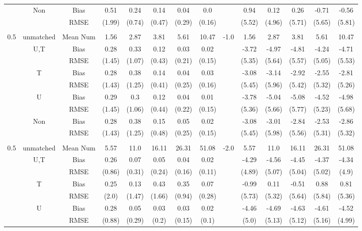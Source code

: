 \begin{tabular}{@{\extracolsep{5pt}}lc|cccccc|lccccc}
 & Non & Bias & 0.51 & 0.24 & 0.14 & 0.04 & 0.0 &  & 0.94 & 0.12 & 0.26 & -0.71 & -0.56 \\
 &  & RMSE & (1.99) & (0.74) & (0.47) & (0.29) & (0.16) &  & (5.52) & (4.96) & (5.71) & (5.65) & (5.81) \\
 &  &  &  &  &  &  &  &  &  &  &  &  &  \\
0.5 & unmatched & Mean Num & 1.56 & 2.87 & 3.81 & 5.61 & 10.47 & -1.0 & 1.56 & 2.87 & 3.81 & 5.61 & 10.47 \\
 & U,T & Bias & 0.28 & 0.33 & 0.12 & 0.03 & 0.02 &  & -3.72 & -4.97 & -4.81 & -4.24 & -4.71 \\
 &  & RMSE & (1.45) & (1.07) & (0.43) & (0.21) & (0.15) &  & (5.35) & (5.64) & (5.57) & (5.05) & (5.53) \\
 & T & Bias & 0.28 & 0.38 & 0.14 & 0.04 & 0.03 &  & -3.08 & -3.14 & -2.92 & -2.55 & -2.81 \\
 &  & RMSE & (1.43) & (1.25) & (0.41) & (0.25) & (0.16) &  & (5.45) & (5.96) & (5.42) & (5.32) & (5.26) \\
 & U & Bias & 0.29 & 0.3 & 0.12 & 0.04 & 0.01 &  & -3.78 & -5.04 & -5.08 & -4.52 & -4.98 \\
 &  & RMSE & (1.45) & (1.06) & (0.44) & (0.22) & (0.15) &  & (5.36) & (5.66) & (5.77) & (5.23) & (5.68) \\
 & Non & Bias & 0.28 & 0.38 & 0.15 & 0.05 & 0.02 &  & -3.08 & -3.01 & -2.84 & -2.53 & -2.86 \\
 &  & RMSE & (1.43) & (1.25) & (0.48) & (0.25) & (0.15) &  & (5.45) & (5.98) & (5.56) & (5.31) & (5.32) \\
 &  &  &  &  &  &  &  &  &  &  &  &  &  \\
0.5 & unmatched & Mean Num & 5.57 & 11.0 & 16.11 & 26.31 & 51.08 & -2.0 & 5.57 & 11.0 & 16.11 & 26.31 & 51.08 \\
 & U,T & Bias & 0.26 & 0.07 & 0.05 & 0.04 & 0.02 &  & -4.29 & -4.56 & -4.45 & -4.37 & -4.34 \\
 &  & RMSE & (0.86) & (0.31) & (0.24) & (0.16) & (0.11) &  & (4.89) & (5.07) & (5.04) & (5.02) & (4.9) \\
 & T & Bias & 0.25 & 0.13 & 0.43 & 0.35 & 0.07 &  & -0.99 & 0.11 & -0.51 & 0.88 & 0.81 \\
 &  & RMSE & (2.0) & (1.47) & (1.66) & (0.94) & (0.28) &  & (5.73) & (5.32) & (5.64) & (5.84) & (5.36) \\
 & U & Bias & 0.28 & 0.05 & 0.03 & 0.03 & 0.02 &  & -4.46 & -4.69 & -4.63 & -4.61 & -4.52 \\
 &  & RMSE & (0.88) & (0.29) & (0.2) & (0.15) & (0.1) &  & (5.0) & (5.13) & (5.12) & (5.16) & (4.99) \\

\end{tabular}
